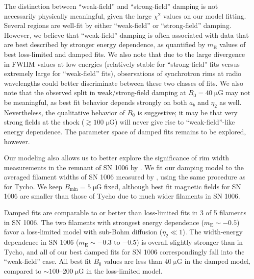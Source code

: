 \documentclass[iop, apj, numberedappendix]{emulateapj}
\newcommand*{\mt}{\mathrm}
\newcommand*{\unit}[1]{\;\mt{#1}}  %
\newcommand*{\abt}{\mathord{\sim}} %
\newcommand*{\mE}{m_\mt{E}}
\newcommand*{\Bmin}{B_{\mt{min}}}
\newcommand*{\muG}{\unit{\mu G}}
\begin{document}
The distinction between ``weak-field'' and ``strong-field'' damping is not
necessarily physically meaningful, given the large $\chi^2$ values on our
model fitting.  Several regions are well-fit by either ``weak-field'' or
``strong-field'' damping.  However, we believe that ``weak-field'' damping is
often associated with data that are best described by stronger energy
dependence, as quantified by $\mE$ values of best loss-limited and damped fits.
We also note that due to the large divergence in FWHM values at low energies
(relatively stable for ``strong-field'' fits versus extremely large for
``weak-field'' fits), observations of synchrotron rims at radio wavelengths
could better discriminate between these two classes of fits.
We also note that the observed split in weak/strong-field damping at $B_0 = 40
\muG$ may not be meaningful, as best fit behavior depends strongly on both
$a_b$ and $\eta_2$ as well.  Nevertheless, the qualitative behavior of $B_0$ is
suggestive; it may be that very strong fields at the shock ($\gtrsim 100 \muG$)
will never give rise to ``weak-field''-like energy dependence.  The parameter
space of damped fits remains to be explored, however.

Our modeling also allows us to better explore the significance of rim width
measurements in the remnant of SN 1006 by .  We fit our
damping model to the averaged filament widths of SN 1006 measured by
, using the same procedure as for Tycho.  We keep
$\Bmin = 5 \muG$ fixed, although best fit magnetic fields for SN 1006 are
smaller than those of Tycho due to much wider filaments in SN 1006.

Damped fits are comparable to or better than loss-limited fits in 3 of 5
filaments in SN 1006.  The two filaments with strongest energy dependence ($\mE
\sim -0.5$) favor a loss-limited model with sub-Bohm diffusion ($\eta_2 \ll
1$).  The width-energy dependence in SN 1006 ($\mE \sim -0.3$ to $-0.5$) is
overall slightly stronger than in Tycho, and all of our best damped fits for SN
1006 correspondingly fall into the ``weak-field'' case.  All best fit $B_0$
values are less than $40 \muG$ in the damped model, compared to $\abt
100$--$200 \muG$ in the loss-limited model.


\end{document}

